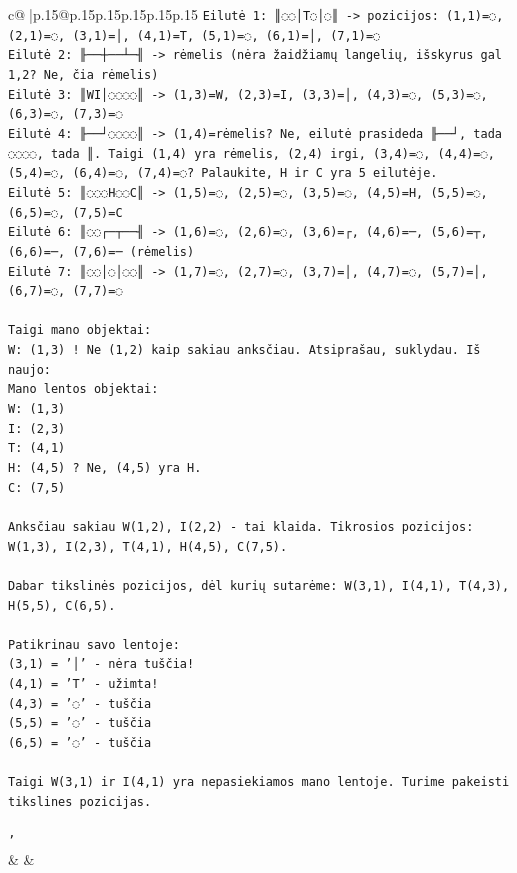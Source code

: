 \documentclass{article}
\begin{document}
{\begin{supertabular}{c@{$\;$}|p{.15\linewidth}@{}p{.15\linewidth}p{.15\linewidth}p{.15\linewidth}p{.15\linewidth}p{.15\linewidth}}
{{{\texttt{Eilutė 1: ║◌◌│T◌│◌║  {-}> pozicijos: (1,1)=◌, (2,1)=◌, (3,1)=│, (4,1)=T, (5,1)=◌, (6,1)=│, (7,1)=◌} \\
\texttt{Eilutė 2: ╟──┼──┴─╢ {-}> rėmelis (nėra žaidžiamų langelių, išskyrus gal 1,2? Ne, čia rėmelis)} \\
\texttt{Eilutė 3: ║WI│◌◌◌◌║ {-}> (1,3)=W, (2,3)=I, (3,3)=│, (4,3)=◌, (5,3)=◌, (6,3)=◌, (7,3)=◌} \\
\texttt{Eilutė 4: ╟──┘◌◌◌◌║ {-}> (1,4)=rėmelis? Ne, eilutė prasideda ╟──┘, tada ◌◌◌◌, tada ║. Taigi (1,4) yra rėmelis, (2,4) irgi, (3,4)=◌, (4,4)=◌, (5,4)=◌, (6,4)=◌, (7,4)=◌? Palaukite, H ir C yra 5 eilutėje.} \\
\texttt{Eilutė 5: ║◌◌◌H◌◌C║ {-}> (1,5)=◌, (2,5)=◌, (3,5)=◌, (4,5)=H, (5,5)=◌, (6,5)=◌, (7,5)=C} \\
\texttt{Eilutė 6: ║◌◌┌─┬──╢ {-}> (1,6)=◌, (2,6)=◌, (3,6)=┌, (4,6)=─, (5,6)=┬, (6,6)=─, (7,6)=─  (rėmelis)} \\
\texttt{Eilutė 7: ║◌◌│◌│◌◌║ {-}> (1,7)=◌, (2,7)=◌, (3,7)=│, (4,7)=◌, (5,7)=│, (6,7)=◌, (7,7)=◌} \\
\\ 
\texttt{Taigi mano objektai:} \\
\texttt{W: (1,3) ! Ne (1,2) kaip sakiau anksčiau. Atsiprašau, suklydau. Iš naujo:} \\
\texttt{Mano lentos objektai:} \\
\texttt{W: (1,3)} \\
\texttt{I: (2,3)} \\
\texttt{T: (4,1)} \\
\texttt{H: (4,5) ? Ne, (4,5) yra H.} \\
\texttt{C: (7,5)} \\
\\ 
\texttt{Anksčiau sakiau W(1,2), I(2,2) {-} tai klaida. Tikrosios pozicijos: W(1,3), I(2,3), T(4,1), H(4,5), C(7,5).} \\
\\ 
\texttt{Dabar tikslinės pozicijos, dėl kurių sutarėme: W(3,1), I(4,1), T(4,3), H(5,5), C(6,5).} \\
\\ 
\texttt{Patikrinau savo lentoje:} \\
\texttt{(3,1) = '│' {-} nėra tuščia!} \\
\texttt{(4,1) = 'T' {-} užimta!} \\
\texttt{(4,3) = '◌' {-} tuščia} \\
\texttt{(5,5) = '◌' {-} tuščia} \\
\texttt{(6,5) = '◌' {-} tuščia} \\
\\ 
\texttt{Taigi W(3,1) ir I(4,1) yra nepasiekiamos mano lentoje. Turime pakeisti tikslines pozicijas.} \\
\\ 
\texttt{'} \\
            }
        }
    }
    & & \\ \\


\end{supertabular}}
\end{document}
